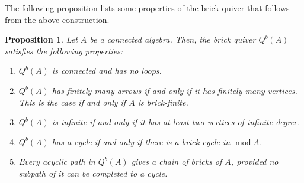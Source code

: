 \documentclass{amsart}
\theoremstyle{thmstyle}
\newtheorem{prop}[thm]{Proposition}
\theoremstyle{exstyle}
\theoremstyle{defstyle}
\theoremstyle{remstyle}
\theoremstyle{remstyle}
\DeclareMathOperator*{\modu}{mod}
\begin{document}
The following proposition lists some properties of the brick quiver that follows from the above construction.

\begin{prop}
Let $A$ be a connected algebra. Then, the brick quiver $Q^b(A)$ satisfies the following properties:
    \begin{enumerate}
    \item $Q^b(A)$ is connected and has no loops.
    \item $Q^b(A)$ has finitely many arrows if and only if it has finitely many vertices. This is the case if and only if $A$ is brick-finite.
    \item $Q^b(A)$ is infinite if and only if it has at least two vertices of infinite degree.
    \item $Q^b(A)$ has a cycle if and only if there is a brick-cycle in $\modu A$.
    \item Every acyclic path in $Q^b(A)$ gives a chain of bricks of $A$, provided no subpath of it can be completed to a cycle.
\end{enumerate}
\end{prop}
\end{document}
